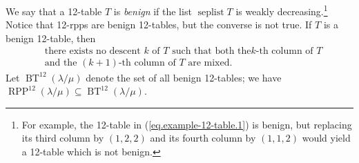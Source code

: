\documentclass[numbers=enddot,12pt,final,onecolumn,notitlepage]{scrartcl}%
\theoremstyle{definition}
\def\OneTwoRPP{{\operatorname{RPP}^{12}\left(  \lambda/\mu\right)}}
\def\BenignTables{{\operatorname{BT}^{12}\left(  \lambda/\mu\right)}}
\begin{document}
We say that a 12-table $T$ is \textit{benign} if the list
$\operatorname*{seplist}T$ is weakly decreasing.\footnote{For
example, the 12-table in (\ref{eq.example-12-table.1}) is benign,
but replacing its third column by $\left(1,2,2\right)$ and its
fourth column by $\left(1,1,2\right)$ would yield a 12-table
which is not benign.}
Notice that 12-rpps are benign 12-tables, but the converse is not true. If $T$ is a benign 12-table, then%
\begin{align}
&  \text{there exists no descent }k\text{ of }T\text{ such that both the
}k\text{-th column of }T\nonumber\\
&  \text{and the }\left(  k+1\right)  \text{-th column of }T\text{ are mixed.}
\label{eq.benign.not-both-mixed}%
\end{align}
Let $\BenignTables$ denote the set of all benign 12-tables; we have $\OneTwoRPP\subseteq\BenignTables$.
\end{document}
